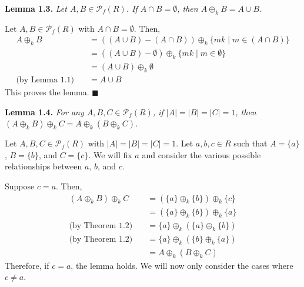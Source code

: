 \documentclass{article}
\newcommand{\abs}[1]{\left|#1\right|}
\begin{document}
\textbf{Lemma 1.3.} \textit{
    Let $A, B \in \mathcal{P}_f(R)$. If $A \cap B = \emptyset$,
    then $A \oplus_k B = A \cup B$.
}

Let $A, B \in \mathcal{P}_f(R)$ with $A \cap B = \emptyset$.
Then,
\[\begin{split}
A \oplus_k B
&= ((A \cup B) - (A \cap B))
    \oplus_k \{mk \mid m \in (A \cap B)\} \\
&= ((A \cup B) - \emptyset)
    \oplus_k \{mk \mid m \in \emptyset\} \\
&= (A \cup B) \oplus_k \emptyset \\
\text{(by Lemma 1.1)}\quad
&= A \cup B
\end{split}\]
This proves the lemma. $\blacksquare$

\textbf{Lemma 1.4.} \textit{
    For any $A, B, C \in \mathcal{P}_f(R)$,
    if $\abs{A} = \abs{B} = \abs{C} = 1$,
    then
    $(A \oplus_k B) \oplus_k C
    = A \oplus_k (B \oplus_k C)$.
}

Let $A, B, C \in \mathcal{P}_f(R)$
with $\abs{A} = \abs{B} = \abs{C} = 1$.
Let $a, b, c \in R$ such that
$A = \{a\}$, $B = \{b\}$, and $C = \{c\}$.
We will fix $a$ and consider the various possible relationships
between $a$, $b$, and $c$.

Suppose $c = a$. Then,
\[\begin{split}
    (A \oplus_k B) \oplus_k C
    &= (\{a\} \oplus_k \{b\}) \oplus_k \{c\} \\
    &= (\{a\} \oplus_k \{b\}) \oplus_k \{a\} \\
    \text{(by Theorem 1.2)}\quad
    &= \{a\} \oplus_k (\{a\} \oplus_k \{b\}) \\
    \text{(by Theorem 1.2)}\quad
    &= \{a\} \oplus_k (\{b\} \oplus_k \{a\}) \\
    &= A \oplus_k (B \oplus_k C)
\end{split}\]
Therefore, if $c = a$, the lemma holds. We will now only
consider the cases where $c \neq a$.
\end{document}

